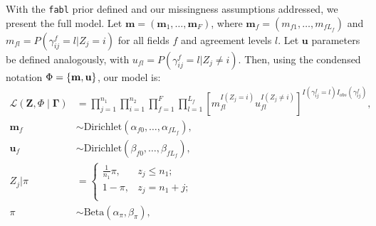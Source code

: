 \documentclass[ba]{imsart}
\begin{document}

%

With the \texttt{fabl} prior defined and our missingness assumptions addressed, we present the full model. Let $\bm{m} = (\bm{m}_1, \ldots, \bm{m}_F)$, where $\bm{m}_f = (m_{f1}, \ldots, m_{fL_f})$ and $m_{fl} = P(\gamma_{ij}^f = l|Z_j = i)$ for all fields $f$ and agreement levels $l$. Let $\bm{u}$ parameters be defined analogously, with $u_{fl} = P(\gamma_{ij}^f = l|Z_j \neq i)$. Then, using the condensed notation $\Phi = \{\bf{m}, \bf{u}\}$, our model is:
\begin{align*}
	\mathcal{L}(\bm{Z}, \Phi \mid \bm{\Gamma}) &= \prod_{j=1}^{n_1}  \prod_{i=1}^{n_2}\prod_{f=1}^{F}\prod_{l=1}^{L_f}\left[  m_{fl}^{I(Z_j = i)}u_{fl}^{I(Z_j \neq i)}\right]^{I(\gamma_{ij}^f = l)I_{obs}(\gamma_{ij}^f)}, \\
	\bm{m}_f &\sim \text{Dirichlet}(\alpha_{f0}, \ldots, \alpha_{f L_f}), \\
	\bm{u}_f &\sim \text{Dirichlet}(\beta_{f0}, \ldots, \beta_{f L_f}), \\
	Z_j | \pi &=
	\begin{cases} 
		\frac{1}{n_1}\pi,  & z_j \leq n_1; \\
		1-\pi, &  z_j  = n_1 + j; \\
	\end{cases} \\
	\pi &\sim \text{Beta}(\alpha_{\pi}, \beta_{\pi}),
\end{align*}
\end{document}
